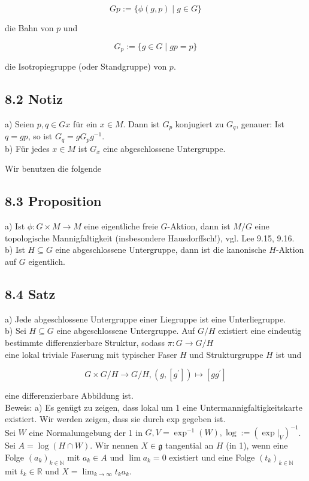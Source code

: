 \documentclass[10pt, letterpaper]{article}
\begin{document}
$$
G p:=\{\phi(g, p) \mid g \in G\}
$$

die Bahn von $p$ und

$$
G_{p}:=\{g \in G \mid g p=p\}
$$

die Isotropiegruppe (oder Standgruppe) von $p$.

\subsection*{8.2 Notiz}
a) Seien $p, q \in G x$ für ein $x \in M$. Dann ist $G_{p}$ konjugiert zu $G_{q}$, genauer: Ist $q=g p$, so ist $G_{q}=g G_{p} g^{-1}$.\\
b) Für jedes $x \in M$ ist $G_{x}$ eine abgeschlossene Untergruppe.

Wir benutzen die folgende

\subsection*{8.3 Proposition}
a) Ist $\phi: G \times M \rightarrow M$ eine eigentliche freie $G$-Aktion, dann ist $M / G$ eine topologische Mannigfaltigkeit (insbesondere Hausdorffsch!), vgl. Lee 9.15, 9.16.\\
b) Ist $H \subseteq G$ eine abgeschlossene Untergruppe, dann ist die kanonische $H$-Aktion auf $G$ eigentlich.

\subsection*{8.4 Satz}
a) Jede abgeschlossene Untergruppe einer Liegruppe ist eine Unterliegruppe.\\
b) Sei $H \subseteq G$ eine abgeschlossene Untergruppe. Auf $G / H$ existiert eine eindeutig bestimmte differenzierbare Struktur, sodass $\pi: G \rightarrow G / H$\\
eine lokal triviale Faserung mit typischer Faser $H$ und Strukturgruppe $H$ ist und

$$
G \times G / H \rightarrow G / H,\left(g,\left[g^{\prime}\right]\right) \mapsto\left[g g^{\prime}\right]
$$

eine differenzierbare Abbildung ist.\\
Beweis: a) Es genügt zu zeigen, dass lokal um 1 eine Untermannigfaltigkeitskarte existiert. Wir werden zeigen, dass sie durch exp gegeben ist.\\
Sei $W$ eine Normalumgebung der 1 in $G, V=\exp ^{-1}(W), \log :=\left(\left.\exp \right|_{V}\right)^{-1}$. Sei $A=\log (H \cap W)$. Wir nennen $X \in \mathfrak{g}$ tangential an $H$ (in 1), wenn eine Folge $\left(a_{k}\right)_{k \in \mathbb{N}}$ mit $a_{k} \in A$ und $\lim a_{k}=0$ existiert und eine Folge $\left(t_{k}\right)_{k \in \mathbb{N}}$ mit $t_{k} \in \mathbb{R}$ und $X=\lim _{k \rightarrow \infty} t_{k} a_{k}$.
\end{document}
